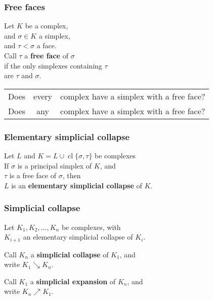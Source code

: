 \documentclass[14pt]{beamer}
\newcommand{\collapses}{\searrow}
\newcommand{\expands}{\nearrow}
\DeclareMathOperator{\cl}{cl}
\begin{document}
\begin{frame}
  \frametitle{Free faces}

  \begin{definition}
  Let $K$ be a complex, \\
  and $\sigma \in K$ a simplex, \\
  and $\tau < \sigma$ a face. \\
  \vspace{1ex}Call $\tau$ a \textbf{free face} of $\sigma$ \\
  if the only simplexes containing $\tau$ \\
  are $\tau$ and $\sigma$.
  \end{definition}

  \pause
  \begin{problem}
    \begin{tabular}{@{}l@{ }c@{ }l}
      Does & every & complex have a simplex with a free face? \\\pause
      Does & any & complex have a simplex with a free face? \\
   \end{tabular}
 \end{problem}

\end{frame}

\begin{frame}
\frametitle{Elementary simplicial collapse}

\begin{definition}
  Let $L$ and $K = L \cup \cl \{ \sigma, \tau \}$ be complexes \\

  \vspace{1ex}If $\sigma$ is a principal simplex of $K$, and \\
  $\tau$ is a free face of $\sigma$, then \\
  $L$ is an \textbf{elementary simplicial collapse} of $K$.
\end{definition}

\end{frame}

\begin{frame}
\frametitle{Simplicial collapse}

\begin{definition}
  Let $K_1, K_2, \ldots, K_n$ be complexes, with \\
  $K_{i+1}$ an elementary simplicial collapse of $K_i$.

  \vspace{1ex}Call $K_n$ a \textbf{simplicial collapse} of $K_1$, and \\
  write $K_1 \collapses K_n$.

  \vspace{1ex}Call $K_1$ a \textbf{simplicial expansion} of $K_n$, and \\
  write $K_n \expands K_1$.
\end{definition}

\end{frame}
\end{document}
